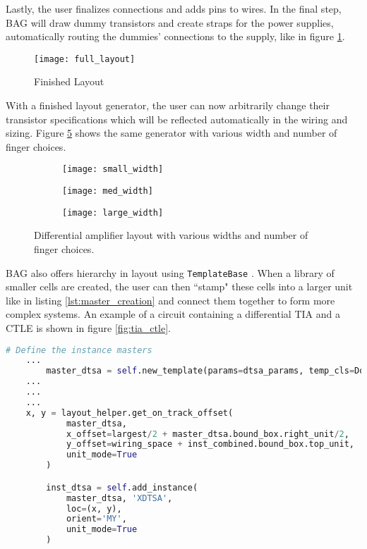 Lastly, the user finalizes connections and adds pins to wires. In the final step, BAG will draw dummy transistors and create straps for the power supplies, automatically routing the dummies' connections to the supply, like in figure \ref{fig:finished_layout}.
\begin{figure}[h]
\centering
\texttt{[image: full\_layout]}
\caption{Finished Layout}
\label{fig:finished_layout}
\end{figure}
With a finished layout generator, the user can now arbitrarily change their transistor specifications which will be reflected automatically in the wiring and sizing. Figure \ref{fig:width_changes} shows the same generator with various width and number of finger choices.
\begin{figure}[h]
\centering
\begin{subfigure}{.4\linewidth}
  \centering
  \texttt{[image: small\_width]}
  \caption{}
  \label{fig:sfig1}
\end{subfigure}
\begin{subfigure}{.4\linewidth}
  \centering
\texttt{[image: med\_width]}
  \caption{}
  \label{fig:sfig2}
\end{subfigure}
\begin{subfigure}{.4\linewidth}
  \centering
\texttt{[image: large\_width]}
  \caption{}
  \label{fig:sfig2}
\end{subfigure}
\caption{Differential amplifier layout with various widths and number of finger choices.}
\label{fig:width_changes}
\end{figure}
\clearpage
BAG also offers hierarchy in layout using \texttt{TemplateBase} \cite{chang_bag2:_2018}. When a library of smaller cells are created, the user can then ``stamp" these cells into a larger unit like in listing \ref{lst:master_creation} and connect them together to form more complex systems. An example of a circuit containing a differential TIA and a CTLE is shown in figure \ref{fig:tia_ctle}.
\begin{lstlisting}[language=Python, caption=Adding and placing templates to a layout, label={lst:master_creation}, float]
# Define the instance masters
	...
        master_dtsa = self.new_template(params=dtsa_params, temp_cls=DoubleTailSenseAmplifier)
	...
	...
	...
	x, y = layout_helper.get_on_track_offset(
            master_dtsa,
            x_offset=largest/2 + master_dtsa.bound_box.right_unit/2,
            y_offset=wiring_space + inst_combined.bound_box.top_unit,
            unit_mode=True
        )

        inst_dtsa = self.add_instance(
            master_dtsa, 'XDTSA',
            loc=(x, y),
            orient='MY',
            unit_mode=True
        )
\end{lstlisting}
